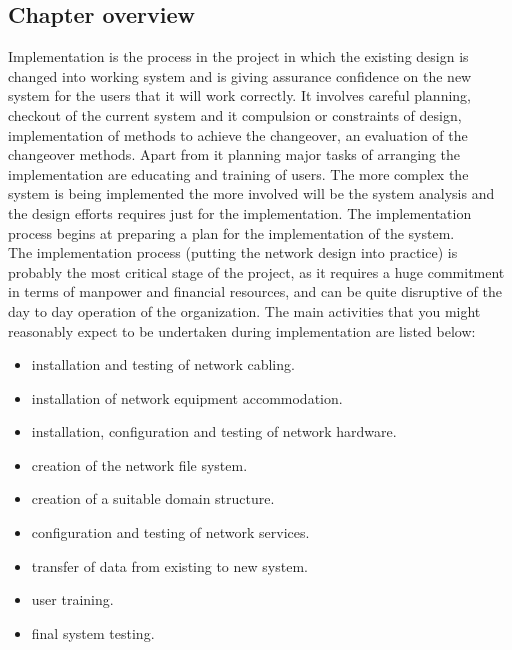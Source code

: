 \documentclass[12pt,a4paper]{article}
\newcommand\tab[1][.7cm]{\hspace*{#1}}
\begin{document}
	\subsection{Chapter overview}
	\tab Implementation is the process in the project in which the existing design is changed
into working system and is giving assurance confidence on the new system for the users
that it will work correctly. It involves careful planning, checkout of the current system
and it compulsion or constraints of design, implementation of methods to achieve the
changeover, an evaluation of the changeover methods. Apart from it planning major tasks
of arranging the implementation are educating and training of users. The more complex
the system is being implemented the more involved will be the system analysis and the
design efforts requires just for the implementation. The implementation process begins at
preparing a plan for the implementation of the system.\\The implementation\cite{Ref:15} process (putting the network design into practice) is probably the most critical stage of the project, as it requires a huge commitment in terms of
manpower and financial resources, and can be quite disruptive of the day to day operation
of the organization. The main activities that you might reasonably expect to be undertaken
during implementation are listed below:
	\begin{itemize}
		\item installation and testing of network cabling.
		\item installation of network equipment accommodation.
		\item installation, configuration and testing of network hardware.
		\item creation of the network file system.
		\item creation of a suitable domain structure.
		\item configuration and testing of network services.
		\item transfer of data from existing to new system.
		\item user training.
		\item final system testing.
	\end{itemize}
\end{document}
